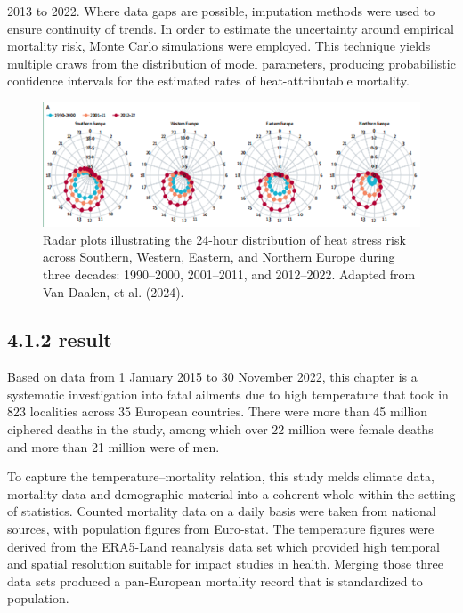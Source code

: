 \documentclass[
]{krantz}
\begin{document}
2013 to 2022. Where data gaps are possible, imputation methods were used to ensure continuity of trends. In order to estimate the uncertainty around empirical mortality risk, Monte Carlo simulations were employed. This technique yields multiple draws from the distribution of model parameters, producing probabilistic confidence intervals for the estimated rates of heat-attributable mortality.

\begin{figure}
\includegraphics[width=1\linewidth]{0} \caption{Radar plots illustrating the 24-hour distribution of heat stress risk across Southern, Western, Eastern, and Northern Europe during three decades: 1990–2000, 2001–2011, and 2012–2022. Adapted from Van Daalen, et al. (2024).}\label{fig:radarplot}
\end{figure}

\subsection{4.1.2 result}\label{result}

Based on data from 1 January 2015 to 30 November 2022, this chapter is a systematic investigation into fatal ailments due to high temperature that took in 823 localities across 35 European countries. There were more than 45 million ciphered deaths in the study, among which over 22 million were female deaths and more than 21 million were of men.

To capture the temperature--mortality relation, this study melds climate data, mortality data and demographic material into a coherent whole within the setting of statistics. Counted mortality data on a daily basis were taken from national sources, with population figures from Euro-stat. The temperature figures were derived from the ERA5-Land reanalysis data set which provided high temporal and spatial resolution suitable for impact studies in health. Merging those three data sets produced a pan-European mortality record that is standardized to population.
\end{document}
